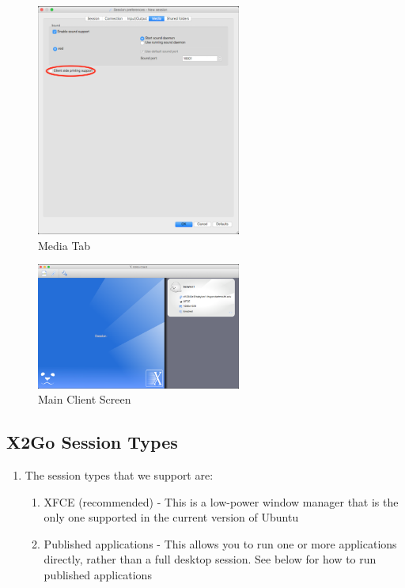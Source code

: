 \begin{figure}[!htb]
	\centering
	\includegraphics[width=0.6\textwidth]{src/images/image4.png}
	\caption{Media Tab}
	\label{fig:fig4}
\end{figure}

\begin{figure}[!htb]
	\centering
	\includegraphics[width=0.6\textwidth]{src/images/image5.png}
	\caption{Main Client Screen}
	\label{fig:fig5}
\end{figure}
\subsection{X2Go Session Types}
\begin{enumerate}[resume]
	\item The session types that we support are:
	\begin{enumerate}[label*=\arabic*.]
		\item XFCE (recommended) - This is a low-power window manager that is the only one supported in the current version of Ubuntu
		\item Published applications - This allows you to run one or more applications directly, rather than a full desktop session. See below for how to run published applications
	\end{enumerate}
\end{enumerate}
